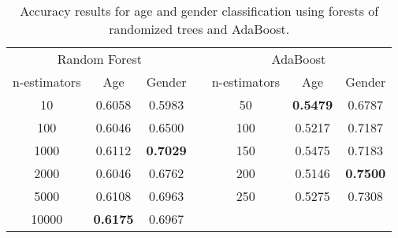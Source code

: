 \documentclass[a4paper]{llncs}
\begin{document}
\begin{table}[!htbp]
\centering
\begin{tabular}{|c|cc|l|c|cc|}
\cline{1-3} \cline{5-7}
\multicolumn{3}{|c|}{Random Forest}              &  & \multicolumn{3}{c|}{AdaBoost}                    \\ \cline{1-3} \cline{5-7} 
n-estimators & Age             & Gender          &  & n-estimators & Age             & Gender          \\ \cline{1-3} \cline{5-7} 
10           & 0.6058          & 0.5983          &  & 50           & \textbf{0.5479} & 0.6787          \\ %
100          & 0.6046          & 0.6500          &  & 100          & 0.5217          & 0.7187          \\ %
1000         & 0.6112          & \textbf{0.7029} &  & 150          & 0.5475          & 0.7183          \\ %
2000         & 0.6046          & 0.6762          &  & 200          & 0.5146          & \textbf{0.7500} \\ %
5000         & 0.6108          & 0.6963          &  & 250          & 0.5275          & 0.7308          \\ %
10000        & \textbf{0.6175} & 0.6967          &  &              &                 &                 \\ \cline{1-3} \cline{5-7} 
\end{tabular}
\caption{Accuracy results for age and gender classification using forests of randomized trees and AdaBoost.}
\label{table:RandomForestsAndAdaBoost}
\end{table}


\end{document}
